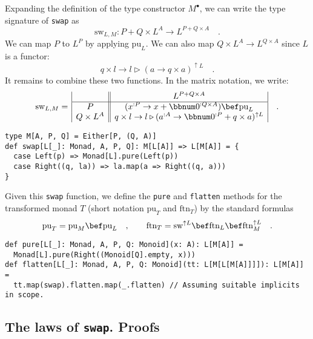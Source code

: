 Expanding the definition of the type constructor $M^{\bullet}$, we
can write the type signature of \lstinline!swap! as 
\[
\text{sw}_{L,M}:P+Q\times L^{A}\rightarrow L^{P+Q\times A}\quad.
\]
We can map $P$ to $L^{P}$ by applying $\text{pu}_{L}$. We can also
map $Q\times L^{A}\rightarrow L^{Q\times A}$ since $L$ is a functor:
\[
q\times l\rightarrow l\triangleright\left(a\rightarrow q\times a\right)^{\uparrow L}\quad.
\]
 It remains to combine these two functions. In the matrix notation,
we write:
\begin{equation}
\text{sw}_{L,M}=\,\begin{array}{|c||c|}
 & L^{P+Q\times A}\\
\hline P & (x^{:P}\rightarrow x+\bbnum 0^{:Q\times A})\bef\text{pu}_{L}\\
Q\times L^{A} & q\times l\rightarrow l\triangleright(a^{:A}\rightarrow\bbnum 0^{:P}+q\times a)^{\uparrow L}
\end{array}\quad.\label{eq:single-valued-monad-def-of-swap}
\end{equation}
\begin{lstlisting}
type M[A, P, Q] = Either[P, (Q, A)]
def swap[L[_]: Monad, A, P, Q]: M[L[A]] => L[M[A]] = {
  case Left(p) => Monad[L].pure(Left(p))
  case Right((q, la)) => la.map(a => Right((q, a)))
}
\end{lstlisting}

Given this \lstinline!swap! function, we define the \lstinline!pure!
and \lstinline!flatten! methods for the transformed monad $T$ (short
notation $\text{pu}_{T}$ and $\text{ftn}_{T}$) by the standard formulas
\[
\text{pu}_{T}=\text{pu}_{M}\bef\text{pu}_{L}\quad,\quad\quad\text{ftn}_{T}=\text{sw}^{\uparrow L}\bef\text{ftn}_{L}\bef\text{ftn}_{M}^{\uparrow L}\quad.
\]
\begin{lstlisting}
def pure[L[_]: Monad, A, P, Q: Monoid](x: A): L[M[A]] =
  Monad[L].pure(Right((Monoid[Q].empty, x)))
def flatten[L[_]: Monad, A, P, Q: Monoid](tt: L[M[L[M[A]]]]): L[M[A]] =
  tt.map(swap).flatten.map(_.flatten) // Assuming suitable implicits in scope.
\end{lstlisting}


\subsection{The laws of \texttt{swap}. Proofs}

